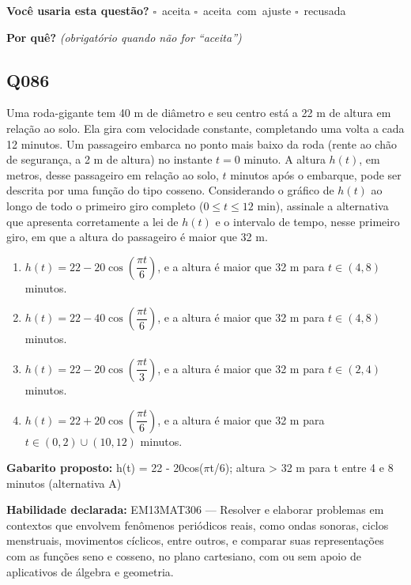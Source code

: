 \documentclass[11pt,a4paper]{article}
\begin{document}
\textbf{Você usaria esta questão?}\quad
\mbox{$\square$~aceita} \quad \mbox{$\square$~aceita com ajuste} \quad
\mbox{$\square$~recusada}

\textbf{Por quê?} \emph{(obrigatório quando não for ``aceita'')}

\underline{\hspace{\linewidth}}

\underline{\hspace{\linewidth}}
\vspace{0.6em}

\begin{samepage}
\subsection*{Q086}
Uma roda-gigante tem 40 m de diâmetro e seu centro está a 22 m de altura em relação ao solo. Ela gira com velocidade constante, completando uma volta a cada 12 minutos. Um passageiro embarca no ponto mais baixo da roda (rente ao chão de segurança, a 2 m de altura) no instante $t = 0$ minuto. A altura $h(t)$, em metros, desse passageiro em relação ao solo, $t$ minutos após o embarque, pode ser descrita por uma função do tipo cosseno. Considerando o gráfico de $h(t)$ ao longo de todo o primeiro giro completo ($0 \le t \le 12$ min), assinale a alternativa que apresenta corretamente a lei de $h(t)$ e o intervalo de tempo, nesse primeiro giro, em que a altura do passageiro é maior que 32 m.
\begin{enumerate}[label=(\alph*),nosep,leftmargin=*]
\item $h(t) = 22 - 20\cos\left(\dfrac{\pi t}{6}\right)$, e a altura é maior que 32 m para $t \in (4, 8)$ minutos.
\item $h(t) = 22 - 40\cos\left(\dfrac{\pi t}{6}\right)$, e a altura é maior que 32 m para $t \in (4, 8)$ minutos.
\item $h(t) = 22 - 20\cos\left(\dfrac{\pi t}{3}\right)$, e a altura é maior que 32 m para $t \in (2, 4)$ minutos.
\item $h(t) = 22 + 20\cos\left(\dfrac{\pi t}{6}\right)$, e a altura é maior que 32 m para $t \in (0, 2) \cup (10, 12)$ minutos.
\end{enumerate}

\textbf{Gabarito proposto:} h(t) = 22 - 20cos($\pi$t/6); altura > 32 m para t entre 4 e 8 minutos (alternativa A)

\textbf{Habilidade declarada:} EM13MAT306 --- Resolver e elaborar problemas em contextos que envolvem fenômenos periódicos reais, como ondas sonoras, ciclos menstruais, movimentos cíclicos, entre outros, e comparar suas representações com as funções seno e cosseno, no plano cartesiano, com ou sem apoio de aplicativos de álgebra e geometria.
\end{samepage}
\end{document}
